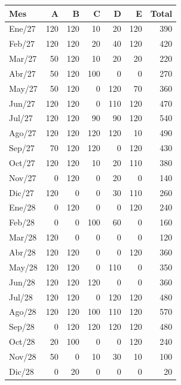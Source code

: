 \begin{tabular}{lr r r r r r}
\toprule
Mes & A & B & C & D & E & Total \\
\midrule
Ene/27 & 120 & 120 & 10 & 20 & 120 & 390 \\
Feb/27 & 120 & 120 & 20 & 40 & 120 & 420 \\
Mar/27 & 50 & 120 & 10 & 20 & 20 & 220 \\
Abr/27 & 50 & 120 & 100 & 0 & 0 & 270 \\
May/27 & 50 & 120 & 0 & 120 & 70 & 360 \\
Jun/27 & 120 & 120 & 0 & 110 & 120 & 470 \\
Jul/27 & 120 & 120 & 90 & 90 & 120 & 540 \\
Ago/27 & 120 & 120 & 120 & 120 & 10 & 490 \\
Sep/27 & 70 & 120 & 120 & 0 & 120 & 430 \\
Oct/27 & 120 & 120 & 10 & 20 & 110 & 380 \\
Nov/27 & 0 & 120 & 0 & 20 & 0 & 140 \\
Dic/27 & 120 & 0 & 0 & 30 & 110 & 260 \\
Ene/28 & 0 & 120 & 0 & 0 & 120 & 240 \\
Feb/28 & 0 & 0 & 100 & 60 & 0 & 160 \\
Mar/28 & 120 & 0 & 0 & 0 & 0 & 120 \\
Abr/28 & 120 & 120 & 0 & 0 & 120 & 360 \\
May/28 & 120 & 120 & 0 & 110 & 0 & 350 \\
Jun/28 & 120 & 120 & 120 & 0 & 0 & 360 \\
Jul/28 & 120 & 120 & 0 & 120 & 120 & 480 \\
Ago/28 & 120 & 120 & 100 & 110 & 120 & 570 \\
Sep/28 & 0 & 120 & 120 & 120 & 120 & 480 \\
Oct/28 & 20 & 100 & 0 & 0 & 120 & 240 \\
Nov/28 & 50 & 0 & 10 & 30 & 10 & 100 \\
Dic/28 & 0 & 20 & 0 & 0 & 0 & 20 \\
\bottomrule
\end{tabular}
